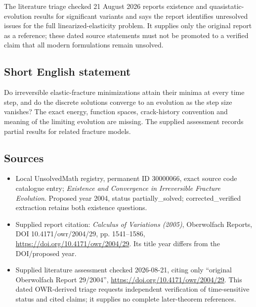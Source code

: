 \documentclass[11pt]{article}
\begin{document}
The literature triage checked 21 August 2026 reports existence and quasistatic-evolution results for significant variants and says the report identifies unresolved issues for the full linearized-elasticity problem. It supplies only the original report as a reference; these dated source statements must not be promoted to a verified claim that all modern formulations remain unsolved.
\subsection{Short English statement}
Do irreversible elastic-fracture minimizations attain their minima at every time step, and do the discrete solutions converge to an evolution as the step size vanishes? The exact energy, function spaces, crack-history convention and meaning of the limiting evolution are missing. The supplied assessment records partial results for related fracture models.
\subsection{Sources}
\begin{itemize}
\item Local UnsolvedMath registry, permanent ID 30000066, exact source code catalogue entry; \emph{Existence and Convergence in Irreversible Fracture Evolution}. Proposed year 2004, status partially\_solved; corrected\_verified extraction retains both existence questions.
\item Supplied report citation: \emph{Calculus of Variations (2005)}, Oberwolfach Reports, DOI 10.4171/owr/2004/29, pp. 1541--1586, \url{https://doi.org/10.4171/owr/2004/29}. Its title year differs from the DOI/proposed year.
\item Supplied literature assessment checked 2026-08-21, citing only ``original Oberwolfach Report 29/2004'', \url{https://doi.org/10.4171/owr/2004/29}. This dated OWR-derived triage requests independent verification of time-sensitive status and cited claims; it supplies no complete later-theorem references.
\end{itemize}
\end{document}
